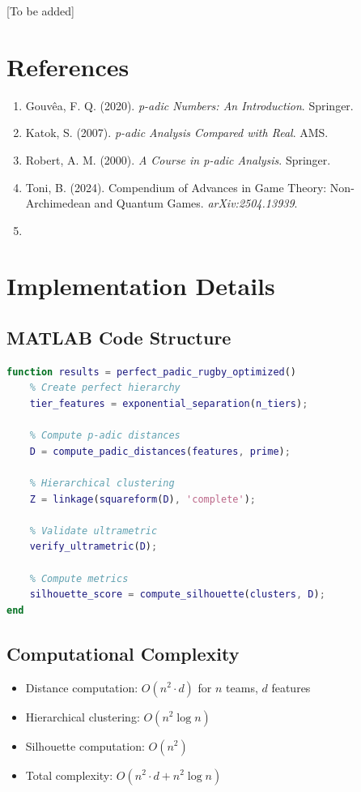 \documentclass[11pt,a4paper]{article}
\begin{document}
[To be added]

\section*{References}

\begin{enumerate}
    \item Gouvêa, F. Q. (2020). \textit{p-adic Numbers: An Introduction}. Springer.
    \item Katok, S. (2007). \textit{p-adic Analysis Compared with Real}. AMS.
    \item Robert, A. M. (2000). \textit{A Course in p-adic Analysis}. Springer.
    \item Toni, B. (2024). Compendium of Advances in Game Theory: Non-Archimedean and Quantum Games. \textit{arXiv:2504.13939}.
    \item [Additional references on sports analytics and clustering methods]
\end{enumerate}

\appendix

\section{Implementation Details}

\subsection{MATLAB Code Structure}

\begin{lstlisting}[language=Matlab, basicstyle=\small]
% Perfect System Generation
function results = perfect_padic_rugby_optimized()
    % Create perfect hierarchy
    tier_features = exponential_separation(n_tiers);
    
    % Compute p-adic distances
    D = compute_padic_distances(features, prime);
    
    % Hierarchical clustering
    Z = linkage(squareform(D), 'complete');
    
    % Validate ultrametric
    verify_ultrametric(D);
    
    % Compute metrics
    silhouette_score = compute_silhouette(clusters, D);
end
\end{lstlisting}

\subsection{Computational Complexity}

\begin{itemize}
    \item Distance computation: $O(n^2 \cdot d)$ for $n$ teams, $d$ features
    \item Hierarchical clustering: $O(n^2 \log n)$
    \item Silhouette computation: $O(n^2)$
    \item Total complexity: $O(n^2 \cdot d + n^2 \log n)$
\end{itemize}
\end{document}
